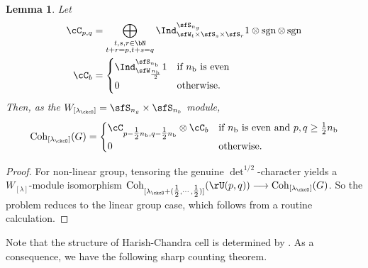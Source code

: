 \documentclass[12pt,a4paper]{amsart}
\newcommand{\trivial}[2][]{\if\relax\detokenize{#1}\relax
  {%
      \color{orange} \vspace{0em} $[$  #2 $]$
      \color{black}
  }
  \else
\ifx#1h
\ifcsname showtrivial\endcsname
{%
    \color{orange} \vspace{0em}  $[$ #2 $]$
    \color{black}
}
\fi
\else {\red Wrong argument!} \fi
\fi
}
\newcommand{\sgn}{\operatorname{sgn}}
\renewcommand{\t}{\mathfrak t}
\numberwithin{equation}{section}
\newtheorem{lem}[thm]{Lemma}
\theoremstyle{remark}
\def\half{{\tfrac{1}{2}}}
\def\lamck{\lambda_\ckcO}
\def\Lamck{[\lambda_\ckcO]}
\def\WLam{W_{\Lam}}
\def\WLamck{W_{[\lambda_{\ckcO}]}}
\def\nbb{n_{\mathrm b}}
\def\Coh{\mathrm{Coh}}
\def\Gg{G_{\mathrm g}}
\newcommand{\Lam}{{[\lambda]}}
\begin{document}
\begin{lem}
  Let
\[
  \begin{split}
    \cC_{p,q} &= \bigoplus_{\substack{t,s,r\in \bN\\t+r=p, t+s = q}}
    \Ind_{\sfW_{t}\times \sfS_s\times \sfS_r}^{\sfS_{n_g}}
 1\otimes \sgn \otimes \sgn \\
 \cC_{b} &= \begin{cases}
  \Ind_{\sfW_{\frac{\nbb}{2}}}^{\sfS_{\nbb}} 1 & \text{if $\nbb$ is even}\\
  0 & \text{otherwise}.
 \end{cases}
  \end{split}
\]
Then, as the $\WLamck =\sfS_{n_g}\times \sfS_{n_b}$ module,
\[
  \Coh_{\Lamck}(G) = \begin{cases}
    \cC_{p-\half \nbb,q-\half \nbb}\otimes \cC_{b} & \text{if $\nbb$ is even and
      $p,q \geq \half \nbb$}\\
    0 & \text{otherwise}.
  \end{cases}
\]
\end{lem}
\begin{proof}
  For non-linear group, tensoring the genuine $\det^{1/2}$-character yields a
  $\WLam$-module isomorphism
  $\Coh_{[\lamck+(\half, \cdots, \half)]}(\rU(p,q)) \longrightarrow \Coh_{\Lamck}(G)$.
  So the problem reduces to the linear group case, which follows from a routine
  calculation.
\end{proof}





Note that the structure of Harish-Chandra cell is determined by \cite{Bo}.
As a consequence, we have the following sharp counting theorem.
\end{document}
